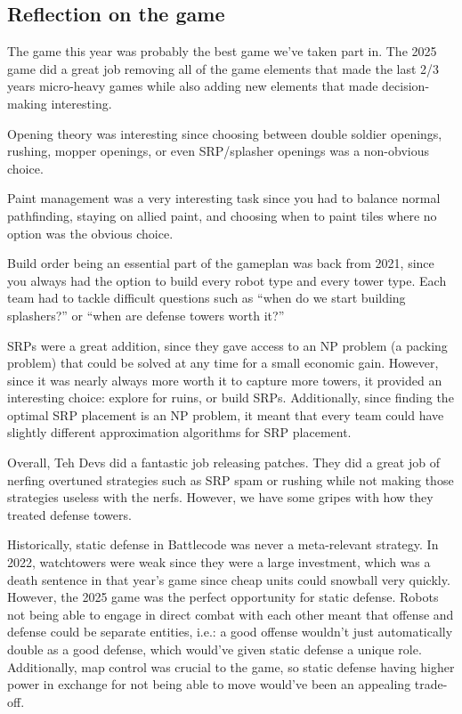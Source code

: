 \subsection{Reflection on the game}

The game this year was probably the best game we've taken part in. The 2025 game did a great job removing all of the game elements that made the last 2/3 years micro-heavy games while also adding new elements that made decision-making interesting. 

\medskip

Opening theory was interesting since choosing between double soldier openings, rushing, mopper openings, or even SRP/splasher openings was a non-obvious choice. 

\medskip

Paint management was a very interesting task since you had to balance normal pathfinding, staying on allied paint, and choosing when to paint tiles where no option was the obvious choice.

\medskip

Build order being an essential part of the gameplan was back from 2021, since you always had the option to build every robot type and every tower type. Each team had to tackle difficult questions such as ``when do we start building splashers?'' or ``when are defense towers worth it?''

\medskip

SRPs were a great addition, since they gave access to an NP problem (a packing problem) that could be solved at any time for a small economic gain. However, since it was nearly always more worth it to capture more towers, it provided an interesting choice: explore for ruins, or build SRPs. Additionally, since finding the optimal SRP placement is an NP problem, it meant that every team could have slightly different approximation algorithms for SRP placement.

\medskip

Overall, Teh Devs did a fantastic job releasing patches. They did a great job of nerfing overtuned strategies such as SRP spam or rushing while not making those strategies useless with the nerfs. However, we have some gripes with how they treated defense towers. 

\medskip

Historically, static defense in Battlecode was never a meta-relevant strategy. In 2022, watchtowers were weak since they were a large investment, which was a death sentence in that year's game since cheap units could snowball very quickly. However, the 2025 game was the perfect opportunity for static defense. Robots not being able to engage in direct combat with each other meant that offense and defense could be separate entities, i.e.: a good offense wouldn't just automatically double as a good defense, which would've given static defense a unique role. Additionally, map control was crucial to the game, so static defense having higher power in exchange for not being able to move would've been an appealing trade-off.

